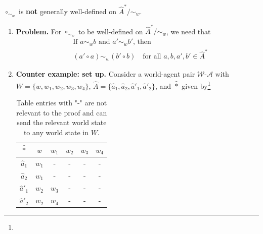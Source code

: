 \begin{propositionE}
    $\circ_{\sim_{w}}$ is \textbf{not} generally well-defined on $\hat{A}^{*}/\sim_{w}$.
\end{propositionE}
\begin{proofE}
\begin{enumerate}[(1)]
    \item \textbf{Problem.}
    For $\circ_{\sim_{w}}$ to be well-defined on $\hat{A}^{*}/\sim_{w}$, we need that
    \begin{equation}
    \begin{aligned}
        & \text{If $a \sim_{w} b$ and $a' \sim_{w} b'$, then} \\
        & (a' \circ a) \sim_{w} (b' \circ b) \quad \text{for all $a, b, a', b' \in \hat{A}^{*}$}
    \end{aligned}
    \end{equation}

    \item \textbf{Counter example: set up.}
    Consider a world-agent pair $\mathscr{W}$-$\mathscr{A}$ with $W = \{w, w_{1}, w_{2}, w_{3}, w_{4} \}$, $\hat{A} = \{ \hat{a}_{1}, \hat{a}_{2}, \hat{a}'_{1}, \hat{a}'_{2} \}$, and $\hat{\ast}$ given by\footnote{
    }
    \begin{table}[H]
        \centering
        \begin{tabular}{c|ccccc}
           $\hat{\ast}$    & $w$       & $w_{1}$   & $w_{2}$   & $w_{3}$   & $w_{4}$ \\
           \hline
           $\hat{a}_{1}$    & $w_{1}$   & -         & -         & -         & - \\
           $\hat{a}_{2}$    & $w_{1}$   & -         & -         & -         & - \\
           $\hat{a}'_{1}$   & $w_{2}$   & $w_{3}$   & -         & -         & - \\
           $\hat{a}'_{2}$   & $w_{2}$   & $w_{4}$   & -         & -         & - \\
        \end{tabular}
        \caption{
        Table entries with "-" are not relevant to the proof and can send the relevant world state to any world state in $W$.
        }
    \end{table}


\end{enumerate}
\end{proofE}
